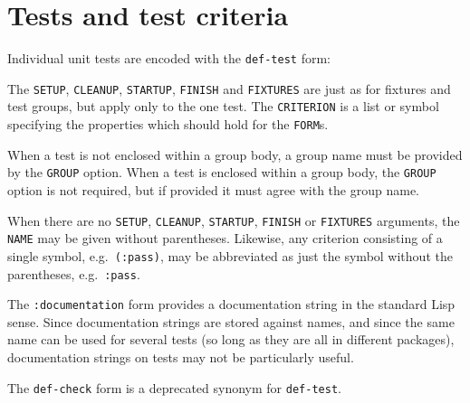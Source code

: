 
\section{Tests and test criteria}
\label{sec:deftest}
Individual unit tests are encoded with the \texttt{def-test} form:

%
The \texttt{SETUP}, \texttt{CLEANUP}, \texttt{STARTUP},
\texttt{FINISH} and \texttt{FIXTURES} are just as for fixtures and
test groups, but apply only to the one test.  The \texttt{CRITERION}
is a list or symbol specifying the properties which should hold for
the \texttt{FORM}s.

When a test is not enclosed within a group body, a group name must be
provided by the \texttt{GROUP} option.  When a test is enclosed within
a group body, the \texttt{GROUP} option is not required, but if
provided it must agree with the group name.

When there are no \texttt{SETUP}, \texttt{CLEANUP}, \texttt{STARTUP},
\texttt{FINISH} or \texttt{FIXTURES} arguments, the \texttt{NAME} may
be given without parentheses.  Likewise, any criterion consisting of a
single symbol, e.g.\ \texttt{(:pass)}, may be abbreviated as just the
symbol without the parentheses, e.g.\ \texttt{:pass}.

The \texttt{:documentation} form provides a documentation string in
the standard Lisp sense.  Since documentation strings are stored
against names, and since the same name can be used for several tests
(so long as they are all in different packages), documentation strings
on tests may not be particularly useful.

The \texttt{def-check} form is a deprecated synonym for
\texttt{def-test}.

\def\criteriaGroup#1#2{\subsection{#1} #2}
\def\secText#1{#1}
\def\endcriteriaGroup{}
\def\manualOrRef#1#2{#1}
\def\criteriaDoc#1#2#3#4#5#6#7#8{%
\subsubsection{The \texttt{#2} criterion} 
#4\index{#1@\texttt{#2}}
\\ Syntax: \texttt{#3}
#7{#8}#6}
\def\noEx#1{}
\def\singleEx#1{\\Example: \texttt{#1}}
\def\multiEx#1{#1}
\def\passExample#1{\\Passing example: \texttt{#1}}
\def\failExample#1{\\Failing example: \texttt{#1}}
\def\tabbingEx#1{\\Example: \begin{tabbing}#1\end{tabbing}}
\def\noExpl{}
\def\hasExpl#1{\par#1}


